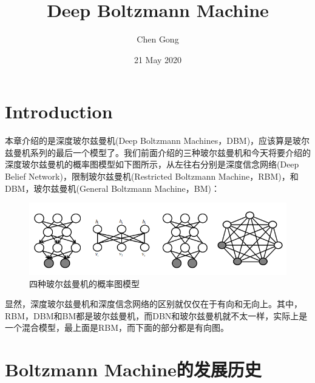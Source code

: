 \documentclass[a4paper]{article}
\title{Deep Boltzmann Machine}
\author{Chen Gong}
\date{21 May 2020}
\begin{document}
\maketitle
\tableofcontents
\newpage
\setcounter{page}{1} %
\clearpage
\maketitle

\section{Introduction}
本章介绍的是深度玻尔兹曼机(Deep Boltzmann Machines，DBM)，应该算是玻尔兹曼机系列的最后一个模型了。我们前面介绍的三种玻尔兹曼机和今天将要介绍的深度玻尔兹曼机的概率图模型如下图所示，从左往右分别是深度信念网络(Deep Belief Network)，限制玻尔兹曼机(Restricted Boltzmann Machine，RBM)，和DBM，玻尔兹曼机(General Boltzmann Machine，BM)：
\begin{figure}[H]
    \centering
    \includegraphics[width=.9\textwidth]{微信图片_20200521215417.png}
    \caption{四种玻尔兹曼机的概率图模型}
    \label{fig:my_label_1}
\end{figure}
显然，深度玻尔兹曼机和深度信念网络的区别就仅仅在于有向和无向上。其中，RBM，DBM和BM都是玻尔兹曼机，而DBN和玻尔兹曼机就不太一样，实际上是一个混合模型，最上面是RBM，而下面的部分都是有向图。

\section{Boltzmann Machine的发展历史}
\end{document}

